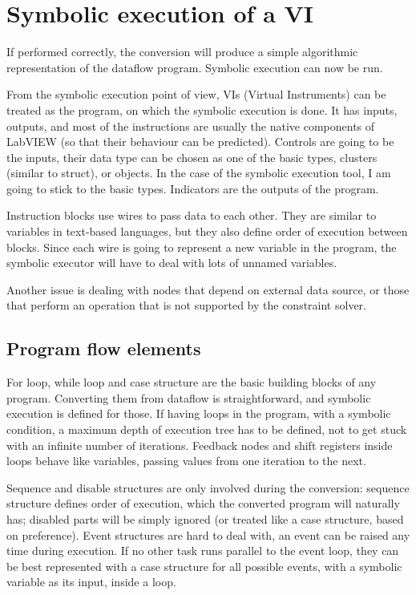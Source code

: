 \section{Symbolic execution of a VI}

If performed correctly, the conversion will produce a simple algorithmic representation of the dataflow program. Symbolic execution can now be run.

From the symbolic execution point of view, VIs (Virtual Instruments) can be treated as the program, on which the symbolic execution is done. It has inputs, outputs, and most of the instructions are usually the native components of LabVIEW (so that their behaviour can be predicted). Controls are going to be the inputs, their data type can be chosen as one of the basic types, clusters (similar to struct), or objects. In the case of the symbolic execution tool, I am going to stick to the basic types. Indicators are the outputs of the program.

Instruction blocks use wires to pass data to each other. They are similar to variables in text-based languages, but they also define order of execution between blocks. Since each wire is going to represent a new variable in the program, the symbolic executor will have to deal with lots of unnamed variables.

Another issue is dealing with nodes that depend on external data source, or those that perform an operation that is not supported by the constraint solver.

\subsection{Program flow elements}
For loop, while loop and case structure are the basic building blocks of any program. Converting them from dataflow is straightforward, and symbolic execution is defined for those. If having loops in the program, with a symbolic condition, a maximum depth of execution tree has to be defined, not to get stuck with an infinite number of iterations. Feedback nodes and shift registers inside loops behave like variables, passing values from one iteration to the next.

Sequence and disable structures are only involved during the conversion: sequence structure defines order of execution, which the converted program will naturally has; disabled parts will be simply ignored (or treated like a case structure, based on preference). Event structures are hard to deal with, an event can be raised any time during execution. If no other task runs parallel to the event loop, they can be best represented with a case structure for all possible events, with a symbolic variable as its input, inside a loop.

